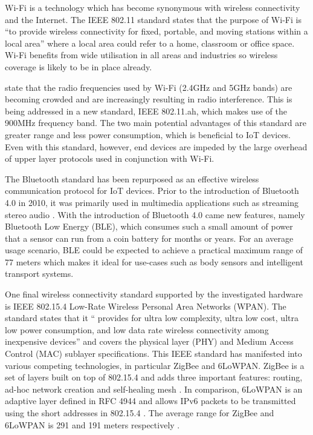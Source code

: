       Wi-Fi is a technology which has become synonymous with wireless connectivity and the Internet. The IEEE 802.11 standard states that the purpose of Wi-Fi is ``to provide wireless connectivity for fixed, portable, and moving stations within a local area'' where a local area could refer to a home, classroom or office space. Wi-Fi benefits from wide utilisation in all areas and industries so wireless coverage is likely to be in place already.

      \citet{wifiah:2012} state that the radio frequencies used by Wi-Fi (2.4GHz and 5GHz bands) are becoming crowded and are increasingly resulting in radio interference. This is being addressed in a new standard, IEEE 802.11.ah, which makes use of the 900MHz frequency band. The two main potential advantages of this standard are greater range and less power consumption, which is beneficial to IoT devices. Even with this standard, however, end devices are impeded by the large overhead of upper layer protocols used in conjunction with Wi-Fi.

      The Bluetooth standard has been repurposed as an effective wireless communication protocol for IoT devices. Prior to the introduction of Bluetooth 4.0 in 2010, it was primarily used in multimedia applications such as streaming stereo audio \citep{bluetooth:2014}. With the introduction of Bluetooth 4.0 came new features, namely Bluetooth Low Energy (BLE), which consumes such a small amount of power that a sensor can run from a coin battery for months or years. For an average usage scenario, BLE could be expected to achieve a practical maximum range of 77 meters \citep{linklabs:2015} which makes it ideal for use-cases such as body sensors and intelligent transport systems.

      One final wireless connectivity standard supported by the investigated hardware is IEEE 802.15.4 Low-Rate Wireless Personal Area Networks (WPAN). The standard states that it `` provides for ultra low complexity, ultra low cost, ultra low power consumption, and low data rate wireless connectivity among inexpensive devices'' and covers the physical layer (PHY) and Medium Access Control (MAC) sublayer specifications. This IEEE standard has manifested into various competing technologies, in particular ZigBee and 6LoWPAN. ZigBee is a set of layers built on top of 802.15.4 and adds three important features: routing, ad-hoc network creation and self-healing mesh \citep{buildingWSN:2010}. In comparison, 6LoWPAN is an adaptive layer defined in RFC 4944 and allows IPv6 packets to be transmitted using the short addresses in 802.15.4 \citep{IPisDead:2008}. The average range for ZigBee and 6LoWPAN is 291 and 191 meters respectively \citep{linklabs:2015}.


